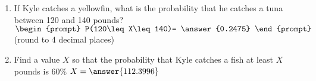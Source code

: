 \documentclass{ximera}
\begin{document}
\begin{enumerate}
\begin{enumerate}
\item If Kyle catches a yellowfin, what is the probability that he catches a tuna between 120 and 140 pounds? $\begin{prompt}
    P(120\leq X\leq 140)= \answer{0.2475}
  \end{prompt}$ (round to 4 decimal places)
  \item  Find a value $X$ so that the probability that Kyle catches a fish at least $X$ pounds is 60\% $X=\answer{112.3996}$
\end{enumerate}




\end{enumerate}





 
 
 
 
      
\end{document}
